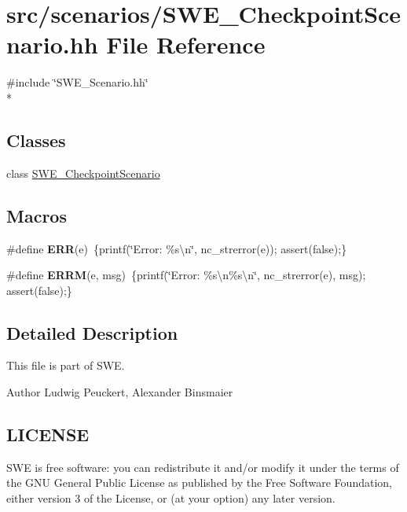 \hypertarget{SWE__CheckpointScenario_8hh}{\section{src/scenarios/\-S\-W\-E\-\_\-\-Checkpoint\-Scenario.hh File Reference}
\label{SWE__CheckpointScenario_8hh}
}
{\ttfamily \#include \char`\"{}S\-W\-E\-\_\-\-Scenario.\-hh\char`\"{}}\\*
\subsection*{Classes}
\begin{DoxyCompactItemize}
\item 
class \hyperlink{classSWE__CheckpointScenario}{S\-W\-E\-\_\-\-Checkpoint\-Scenario}
\end{DoxyCompactItemize}
\subsection*{Macros}
\begin{DoxyCompactItemize}
\item 
\hypertarget{SWE__CheckpointScenario_8hh_a588357de2986fdf4c1380190f7ae9f37}{\#define {\bfseries E\-R\-R}(e)~\{printf(\char`\"{}Error\-: \%s\textbackslash{}n\char`\"{}, nc\-\_\-strerror(e)); assert(false);\}}\label{SWE__CheckpointScenario_8hh_a588357de2986fdf4c1380190f7ae9f37}

\item 
\hypertarget{SWE__CheckpointScenario_8hh_a742b6995c6388de5a6880ed2f9eab9dc}{\#define {\bfseries E\-R\-R\-M}(e, msg)~\{printf(\char`\"{}Error\-: \%s\textbackslash{}n\%s\textbackslash{}n\char`\"{}, nc\-\_\-strerror(e), msg); assert(false);\}}\label{SWE__CheckpointScenario_8hh_a742b6995c6388de5a6880ed2f9eab9dc}

\end{DoxyCompactItemize}


\subsection{Detailed Description}
This file is part of S\-W\-E.

\begin{DoxyAuthor}{Author}
Ludwig Peuckert, Alexander Binsmaier
\end{DoxyAuthor}
\hypertarget{Writer_8hh_LICENSE}{}\subsection{L\-I\-C\-E\-N\-S\-E}\label{Writer_8hh_LICENSE}
S\-W\-E is free software\-: you can redistribute it and/or modify it under the terms of the G\-N\-U General Public License as published by the Free Software Foundation, either version 3 of the License, or (at your option) any later version.

